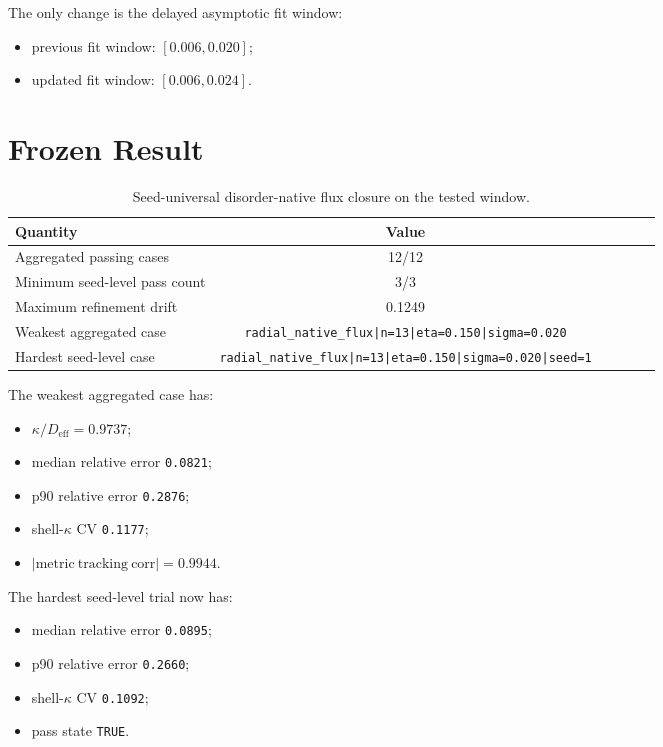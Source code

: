 \documentclass[11pt]{article}
\begin{document}
The only change is the delayed asymptotic fit window:
\begin{itemize}
\item previous fit window: \([0.006, 0.020]\);
\item updated fit window: \([0.006, 0.024]\).
\end{itemize}

\section{Frozen Result}

\begin{table}[h!]
\centering
\begin{tabular}{@{}lccccc@{}}
\toprule
Quantity & Value \\
\midrule
Aggregated passing cases & 12/12 \\
Minimum seed-level pass count & 3/3 \\
Maximum refinement drift & 0.1249 \\
Weakest aggregated case & \texttt{radial\_native\_flux|n=13|eta=0.150|sigma=0.020} \\
Hardest seed-level case & \texttt{radial\_native\_flux|n=13|eta=0.150|sigma=0.020|seed=1} \\
\bottomrule
\end{tabular}
\caption{Seed-universal disorder-native flux closure on the tested window.}
\end{table}

The weakest aggregated case has:
\begin{itemize}
\item \(\kappa / D_{\mathrm{eff}} = 0.9737\);
\item median relative error \texttt{0.0821};
\item p90 relative error \texttt{0.2876};
\item shell-\(\kappa\) CV \texttt{0.1177};
\item \(|\mathrm{metric\ tracking\ corr}| = 0.9944\).
\end{itemize}

The hardest seed-level trial now has:
\begin{itemize}
\item median relative error \texttt{0.0895};
\item p90 relative error \texttt{0.2660};
\item shell-\(\kappa\) CV \texttt{0.1092};
\item pass state \texttt{TRUE}.
\end{itemize}
\end{document}
